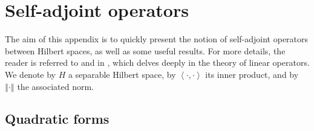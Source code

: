 \documentclass{jams-l}
\theoremstyle{definition}
\theoremstyle{remark}
\numberwithin{equation}{section}
\begin{document}
\appendix

\section{Self-adjoint operators}
\label{AppSelfAdjointOp}

    The aim of this appendix is to quickly present the notion of self-adjoint operators between Hilbert spaces, as well as some useful results. For more details, the reader is referred to \cite[Appendix C]{MR2339952} and in \cite{MR1335452}, which delves deeply in the theory of linear operators. We denote by $H$ a separable Hilbert space, by $\left< \cdot, \cdot \right>$ its inner product, and by $\left \Vert \cdot \right \Vert$ the associated norm.
    
    \subsection{Quadratic forms}
    
\end{document}
